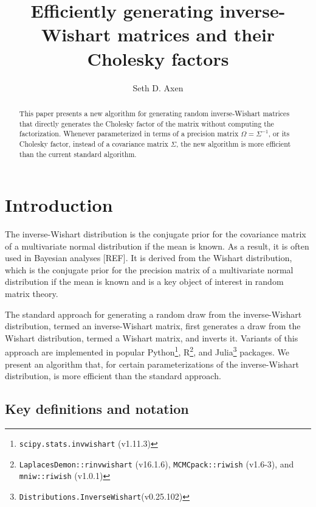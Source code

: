 \documentclass[12pt,a4paper,reqno]{amsart}
\numberwithin{equation}{section}
\begin{document}
\title[Efficiently generating inverse-Wishart matrices]{Efficiently generating inverse-Wishart matrices and their Cholesky factors}
\author{Seth D. Axen}
\address{University of Tübingen, Germany}

\begin{abstract}
    This paper presents a new algorithm for generating random inverse-Wishart matrices that directly generates the Cholesky factor of the matrix without computing the factorization.
    Whenever parameterized in terms of a precision matrix $\Omega=\Sigma^{-1}$, or its Cholesky factor, instead of a covariance matrix $\Sigma$, the new algorithm is more efficient than the current standard algorithm.
\end{abstract}

\maketitle

\section{Introduction}

The inverse-Wishart distribution is the conjugate prior for the covariance matrix of a multivariate normal distribution if the mean is known.
As a result, it is often used in Bayesian analyses [REF].
It is derived from the Wishart distribution, which is the conjugate prior for the precision matrix of a multivariate normal distribution if the mean is known and is a key object of interest in random matrix theory.

The standard approach for generating a random draw from the inverse-Wishart distribution, termed an inverse-Wishart matrix, first generates a draw from the Wishart distribution, termed a Wishart matrix, and inverts it.
Variants of this approach are implemented in popular Python\footnote{\texttt{scipy.stats.invwishart} (v1.11.3)}, R\footnote{\texttt{LaplacesDemon::rinvwishart} (v16.1.6), \texttt{MCMCpack::riwish} (v1.6-3), and \texttt{mniw::riwish} (v1.0.1)}, and Julia\footnote{\texttt{Distributions.InverseWishart}(v0.25.102)} packages.
We present an algorithm that, for certain parameterizations of the inverse-Wishart distribution, is more efficient than the standard approach.

\subsection*{Key definitions and notation}
\end{document}
